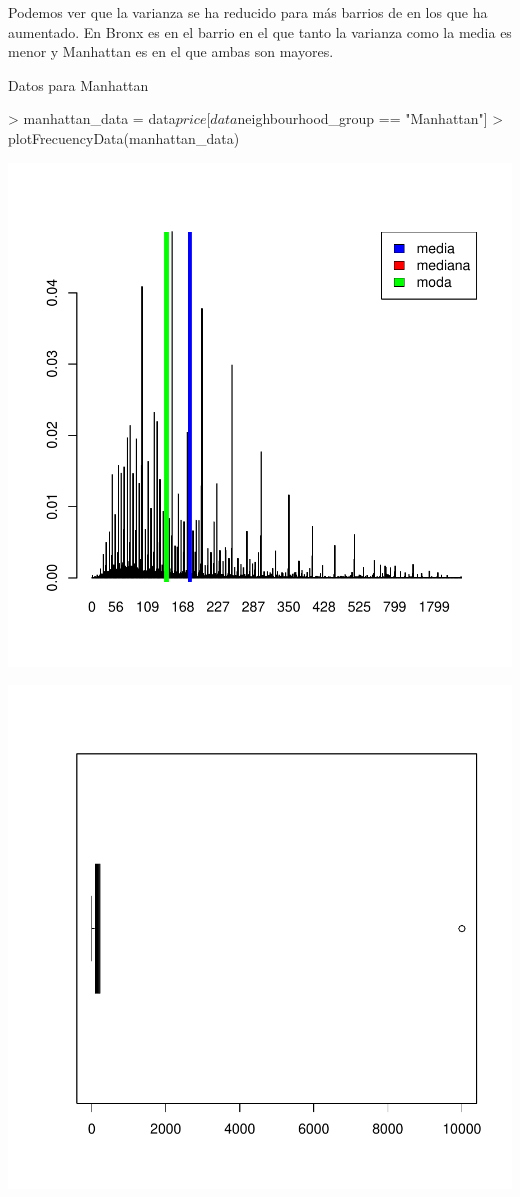\documentclass [a4paper] {article}
\begin{document}
Podemos ver que la varianza se ha reducido para más barrios de en los que ha aumentado.
En Bronx es en el barrio en el que tanto la varianza como la media es menor y 
Manhattan es en el que ambas son mayores.

Datos para Manhattan
\begin{center}
\begin{Schunk}
\begin{Sinput}
> manhattan_data = data$price[data$neighbourhood_group == "Manhattan"]
> plotFrecuencyData(manhattan_data)
\end{Sinput}
\end{Schunk}
\includegraphics{entrega-024}
\end{center}
\begin{center}
\includegraphics{entrega-025}
\end{center}
\end{document}
